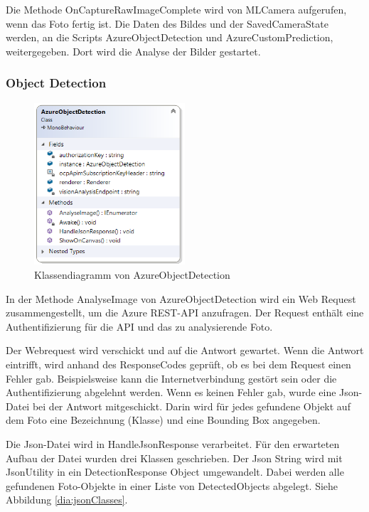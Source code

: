 Die Methode OnCaptureRawImageComplete wird von MLCamera aufgerufen, wenn das Foto fertig ist. Die Daten des Bildes und der SavedCameraState werden, an die Scripts AzureObjectDetection und AzureCustomPrediction, weitergegeben. Dort wird die Analyse der Bilder gestartet. 

\subsubsection{Object Detection}

\begin{figure}[H]
	\centering
	\includegraphics[width=0.5\textwidth]{images/dia_azureobjectdetection.PNG}
	\caption[Klassendiagramm von AzureObjectDetection]{Klassendiagramm von AzureObjectDetection}
	\label{dia:azureobjectdetection}
\end{figure}

In der Methode AnalyseImage von AzureObjectDetection wird ein Web Request zusammengestellt, um die Azure REST-API anzufragen. Der Request enthält eine Authentifizierung für die API und das zu analysierende Foto. %

Der Webrequest wird verschickt und auf die Antwort gewartet. Wenn die Antwort eintrifft, wird anhand des ResponseCodes geprüft, ob es bei dem Request einen Fehler gab. Beispielsweise kann die Internetverbindung gestört sein oder die Authentifizierung abgelehnt werden.
Wenn es keinen Fehler gab, wurde eine Json-Datei bei der Antwort mitgeschickt. Darin wird für jedes gefundene Objekt auf dem Foto eine Bezeichnung (Klasse) und eine Bounding Box angegeben. 

Die Json-Datei wird in HandleJsonResponse verarbeitet. Für den erwarteten Aufbau der Datei wurden drei Klassen geschrieben. Der Json String wird mit JsonUtility in ein DetectionResponse Object umgewandelt. Dabei werden alle gefundenen Foto-Objekte in einer Liste von DetectedObjects abgelegt. Siehe Abbildung \ref{dia:jsonClasses}. \citep{fromjson}

